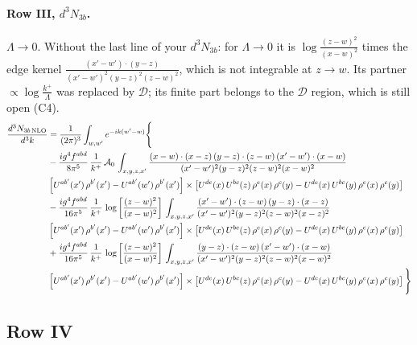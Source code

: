 \documentclass[10pt]{article}
\numberwithin{equation}{section}
\begin{document}
\paragraph{Row III, $d^3N_{3b}$.}
$\Lambda\to0$. Without the last line of your $d^3N_{3b}$: for $\Lambda\to0$ it is $\log\frac{(z-w)^2}{(x-w)^2}$ times the edge kernel $\frac{(x'-w')\cdot(y-z)}{(x'-w')^2(y-z)^2(z-w)^2}$, which is not integrable at $z\to w$. Its partner $\propto\log\frac{k^+}{\Lambda}$ was replaced by $\mathcal D$; its finite part belongs to the $\mathcal D$ region, which is still open (C4).
\begin{align}
\frac{d^{3}N_{3b\,\rm NLO}}{d^{3}k} & = \frac{1}{(2\pi)^{3}}\int_{w,w'}e^{-ik(w'-w)}\Bigg\{\notag \\
&-\frac{ig^{4}f^{abd}}{8\pi^{5}}\,\frac{1}{k^{+}}\,\mathcal{A}_{0}\,\int_{x,y,z,x'}
\frac{(x-w)\cdot(x-z)\,(y-z)\cdot(z-w)\,(x'-w')\cdot(x-w)}{(x'-w')^{2}(y-z)^{2}(z-w)^{2}(x-w)^{2}}\notag \\ & \left[U^{ab'}(x')\,\rho^{b'}(x')-U^{ab'}(w')\, \rho^{b'}(x')\right]\times \left[U^{de}(x)\,U^{bc}(z)\, \rho^{e}(x)\,\rho^{c}(y)-U^{de}(x)\,U^{bc}(y)\,\rho^{e}(x)\,\rho^{c}(y)\right] \notag \\
& -\frac{ig^{4}f^{abd}}{16\pi^{5}}\,\frac{1}{k^{+}}\,\log{\left[\frac{(z-w)^{2}}{(x-w)^{2}}\right]}\,\int_{x,y,z,x'}
\frac{(x'-w')\cdot(z-w)\,(y-z)\cdot(x-z)}{(x'-w')^{2}(y-z)^{2}(z-w)^{2}(x-z)^{2}}\notag \\
&\left[U^{ab'}(x')\,\rho^{b'}(x')-U^{ab'}(w')\, \rho^{b'}(x')\right]\times \left[U^{de}(x)\,U^{bc}(z)\, \rho^{e}(x)\,\rho^{c}(y)-U^{de}(x)\,U^{bc}(y)\,\rho^{e}(x)\,\rho^{c}(y)\right] \notag \\
&+ \frac{ig^{4}f^{abd}}{16\pi^{5}}\,\frac{1}{k^{+}}\,\log{\left[\frac{(z-w)^{2}}{(x-w)^{2}}\right]}\,\int_{x,y,z,x'}
\frac{(y-z)\cdot(z-w)\,(x'-w')\cdot(x-w)}{(x'-w')^{2}(y-z)^{2}(z-w)^{2}(x-w)^{2}}\notag \\ 
& \left[U^{ab'}(x')\,\rho^{b'}(x')-U^{ab'}(w')\, \rho^{b'}(x')\right]\times \left[U^{de}(x)\,U^{bc}(z)\, \rho^{e}(x)\,\rho^{c}(y)-U^{de}(x)\,U^{bc}(y)\,\rho^{e}(x)\,\rho^{c}(y)\right]\Bigg\} \label{eq:R:G1IIIN3b}
\end{align}

\subsection{Row IV}
\end{document}
